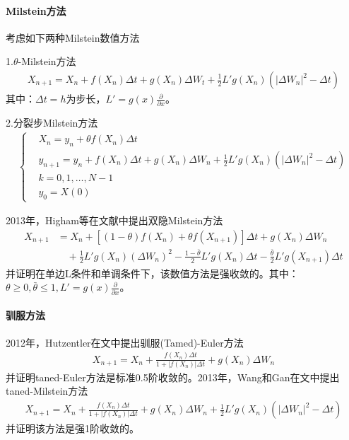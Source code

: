         \paragraph{Milstein方法}考虑如下两种Milstein数值方法
        \par
        1.$\theta$-Milstein方法
        \begin{align*}
        X_{n+1} = X_n + f(X_n)\Delta t+ g(X_n)\Delta W_t + \frac{ 1}{2}L'g(X_n)(|\Delta W_n|^2 - \Delta t)
        \end{align*}
        其中：$\Delta t= h$为步长，$L' = g(x)\frac{\partial}{\partial x}$。
        \par
        2.分裂步Milstein方法
        \begin{align*}
            \left\{
                \begin{aligned}
                &X_n = y_n + \theta f(X_n)\Delta t\\
                &y_{n+1} = y_n + f(X_n)\Delta t+ g(X_n)\Delta W_n + \frac{1}{2}L'g(X_n)(|\Delta W_n|^2 - \Delta t)\\
                &k = 0,1,\dots,N-1\\
                &y_0 = X(0)
                \end{aligned}
            \right.
        \end{align*}
        \par
        2013年，Higham等在文献\cite{2013.Higham}中提出双隐Milstein方法
        \begin{align*}
            X_{n+1} &= X_n+[(1-\theta)f(X_n) + \theta f(X_{n+1}) ]\Delta t + g(X_n)\Delta W_n\\
            &\quad +\frac 12 L'g(X_n)(\Delta W_n)^2 - \frac{1- \bar{\theta}}{2}L'g(X_n)\Delta t - \frac{\bar{\theta}}{2}L'g(X_{n+1})\Delta t
        \end{align*}
        并证明在单边L条件和单调条件下，该数值方法是强收敛的。其中：$\theta \geqslant 0,\bar{\theta} \leqslant 1,L' = g(x)\frac{\partial}{\partial x}$。
        \paragraph{驯服方法}2012年，Hutzentler在文\cite{2012.Hutzenthaler}中提出驯服(Tamed)-Euler方法
        \begin{align*}
            X_{n+1} = X_n + \frac{f(X_n)\Delta t}{1+|f(X_n)|\Delta t} + g(X_n)\Delta W_n
        \end{align*}
        并证明taned-Euler方法是标准0.5阶收敛的。2013年，Wang和Gan在文\cite{2013.Wang}中提出taned-Milstein方法
        \begin{align*}
        X_{n+1} = X_n +\frac{f(X_n)\Delta t}{1+|f(X_n)|\Delta t} + g(X_n)\Delta W_n + \frac{1}{2}L'g(X_n)(|\Delta W_n|^2 - \Delta t)
        \end{align*}
        并证明该方法是强1阶收敛的。
